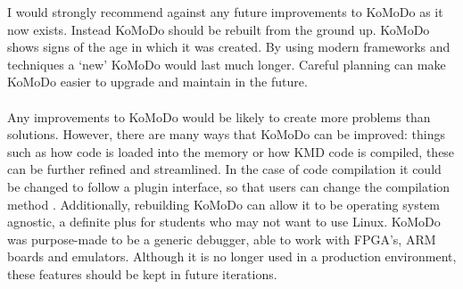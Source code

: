 %
%
%
I would strongly recommend against any future improvements to KoMoDo as it now exists. Instead KoMoDo should be rebuilt from the ground up. KoMoDo shows signs of the age in which it was created. By using modern frameworks and techniques a `new' KoMoDo would last much longer. Careful planning can make KoMoDo easier to upgrade and maintain in the future.\\\\
%
Any improvements to KoMoDo would be likely to create more problems than solutions. However, there are many ways that KoMoDo can be improved: things such as how code is loaded into the memory or how KMD code is compiled, these can be further refined and streamlined. In the case of code compilation it could be changed to follow a plugin interface, so that users can change the compilation method . Additionally, rebuilding KoMoDo can allow it to be operating system agnostic, a definite plus for students who may not want to use Linux. KoMoDo was purpose-made to be a generic debugger, able to work with FPGA's, ARM boards and emulators. Although it is no longer used in a production environment, these features should be kept in future iterations.
